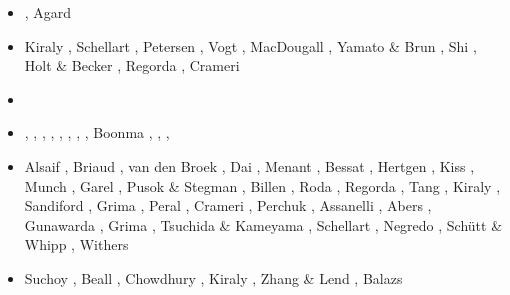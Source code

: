 \begin{scriptsize}
\begin{itemize}
                           \cite{carr15}
\item[\twothousandsixteen] \cite{tomy16}\cite{gukt16}
                           \cite{robn16}\cite{mavm16}
                           \cite{magc16}\cite{marl16}
                           \cite{mesj16}\cite{jada16}
                           \cite{jada16b}\cite{liku16}
                           \cite{chss16}, Agard \etal \cite{agys16}
\item[\twothousandseventeen] Kiraly \etal \cite{kicf17}, Schellart \cite{sche17}, 
                             Petersen \etal \cite{pest17}, Vogt \etal \cite{vomc17}, 
                             MacDougall \etal \cite{majf17}, Yamato \& Brun \cite{yabr17}, 
                             Shi \etal \cite{shwl17}, Holt \& Becker \cite{hobe17}, 
                             Regorda \etal \cite{rerm17}, Crameri \etal \cite{crlt17}
\item[\twothousandeighteen] \cite{yamz18}\cite{crli18}
                            \cite{spcv18}\cite{chss18}
                            \cite{yagz18}\cite{mazh18}
                            \cite{pukp18}\cite{masg18}
                            \cite{biar18}
\item[\twothousandnineteen] \cite{magn19}, \cite{mavb19},
                            \cite{scvm19}, \cite{cakc19},
                            \cite{samo19}, \cite{sihf19},
                            \cite{meag19}, \cite{vaws19}, 
                            Boonma \etal \cite{bokg19}, \cite{vawg19},
                            \cite{cibi19}, \cite{pust19}
\item[\twothousandtwenty] Alsaif \etal \cite{algg20}, Briaud \etal \cite{braf20},
                          van den Broek \etal \cite{vamg20}, Dai \etal \cite{dawl20},
                          Menant \etal \cite{meag20}, Bessat \etal \cite{bedh20},
                          Hertgen \etal \cite{heyg20}, Kiss \etal \cite{kicd20},
                          Munch \etal \cite{mugu20}, Garel \etal \cite{gatt20},
                          Pusok \& Stegman \cite{pust20}, Billen \cite{bill20},
                          Roda \etal \cite{rozr20}, Regorda \etal \cite{relr20}, 
                          Tang \etal \cite{tacm20}, Kiraly \etal \cite{kiph20}, 
                          Sandiford \etal \cite{sams20}, Grima \etal \cite{grlc20}, 
                          Peral \etal \cite{perz20}, Crameri \etal \cite{crmd20}, 
                          Perchuk \etal \cite{pegz20}, Assanelli \etal \cite{aslr20}, 
                          Abers \etal \cite{abvw20}, Gunawarda \etal \cite{gumc20},
                          Grima \etal \cite{grlc20}, Tsuchida \& Kameyama \cite{tska20},
                          Schellart \cite{sche20}, Negredo \etal \cite{nemc20},
                          Sch{\"u}tt \& Whipp \cite{scwh20}, Withers \cite{with20}
\item[\twothousandtwentyone] Suchoy \etal \cite{sugm21}, Beall \etal \cite{befd21},
                             Chowdhury \etal \cite{chcg21}, Kiraly \etal \cite{kifc21},
                             Zhang \& Lend \cite{zhle21}, Balazs \etal \cite{bafu21}
\end{itemize}
\end{scriptsize}

